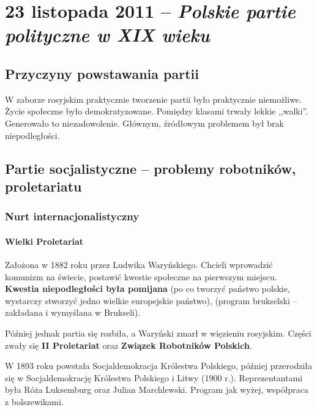 \documentclass [a4paper, 11pt, oneside]{book}
\begin{document}
\chapter{23 listopada 2011 -- \textit{Polskie partie polityczne w XIX wieku}} %
\label{cha:23_listopada_2011_textit}
    \section{Przyczyny powstawania partii} %
    \label{sec:przyczyny_powstawania_partii}
        W zaborze rosyjskim praktycznie tworzenie partii było praktycznie niemożliwe. Życie społeczne było demokratyzowane. Pomiędzy klasami trwały lekkie ,,walki''. Generowało to niezadowolenie. Głównym, źródłowym problemem był brak niepodległości.
    \section{Partie socjalistyczne -- problemy robotników, proletariatu} %
    \label{sec:partie_socjalistyczne_problemy_robotnik_w_proletariatu}
        \subsection{Nurt internacjonalistyczny} %
        \label{sub:nurt_internacjonalistyczny}
            \subsubsection{Wielki Proletariat} %
            \label{ssub:wielki_proletariat}
                Założona w 1882 roku przez Ludwika Waryńskiego. Chcieli wprowadzić komunizm na świecie, postawić kwestie społeczne na pierwszym miejscu. \textbf{Kwestia niepodległości była pomijana} (po co tworzyć państwo polskie, wystarczy stworzyć jedno wielkie europejskie państwo), (program brukselski -- zakładana i wymyślana w Brukseli).

                Później jednak partia się rozbiła, a Waryński zmarł w więzieniu rosyjskim. Części zwały się \textbf{II Proletariat} oraz \textbf{Związek Robotników Polskich}.

                W 1893 roku powstała Socjaldemokracja Królestwa Polskiego, później przerodziła się w Socjaldemokrację Królestwa Polskiego i Litwy (1900 r.). Reprezentantami była Róża Luksemburg oraz Julian Marchlewski. Program jak wyżej, współpraca z bolszewikami.
\end{document}
